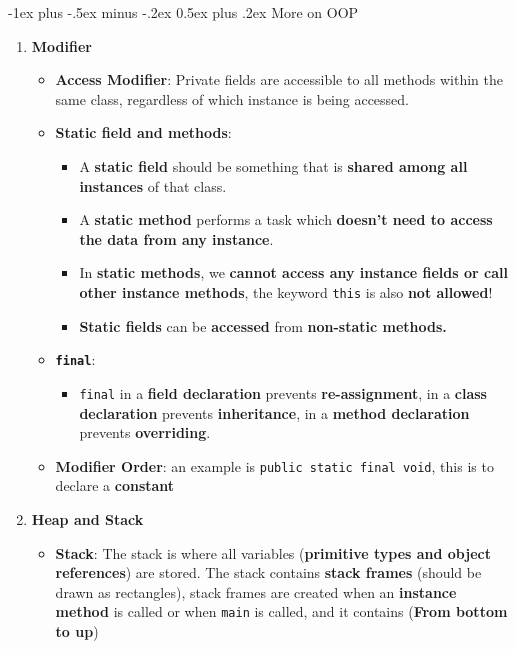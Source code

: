 \documentclass[10pt, landscape]{article}
\makeatletter
\renewcommand{\section}{\@startsection{section}{1}{0mm}%
                                {-1ex plus -.5ex minus -.2ex}%
                                {0.5ex plus .2ex}%
                                {\normalfont\large\bfseries}}
\makeatother
\begin{document}
\begin{multicols}{4}
\section{More on OOP}
\begin{enumerate}
    \item \textbf{Modifier}
    \begin{itemize}
        \item \textbf{Access Modifier}: Private fields are accessible to all methods within the same class, regardless of which instance is being accessed.
        \item \textbf{Static field and methods}:
        \begin{itemize}
            \item A \textbf{static field} should be something that is \textbf{shared among all instances} of that class.
            \item A \textbf{static method} performs a task which \textbf{doesn’t need to access the data from any instance}.
            \item In \textbf{static methods}, we \textbf{cannot access any instance fields or call other instance methods}, the keyword \texttt{this} is also \textbf{not allowed}!
            \item \textbf{Static fields} can be \textbf{accessed} from \textbf{non-static methods.}
        \end{itemize}
        \item \textbf{\texttt{final}}: 
        \begin{itemize}
            \item \texttt{final} in a \textbf{field declaration} prevents \textbf{re-assignment}, in a \textbf{class declaration} prevents \textbf{inheritance}, in a \textbf{method declaration} prevents \textbf{overriding}.
        \end{itemize}
        \item \textbf{Modifier Order}: an example is \texttt{public static final void}, this is to declare a \textbf{constant}
    \end{itemize}
    \item \textbf{Heap and Stack}
    \begin{itemize}
        \item \textbf{Stack}: The stack is where all variables (\textbf{primitive types and object references}) are stored. The stack contains \textbf{stack frames} (should be drawn as rectangles), stack frames are created when an \textbf{instance method} is called or when \texttt{main} is called, and it contains (\textbf{From bottom to up})

\end{itemize}
\end{enumerate}
\end{multicols}
\end{document}
